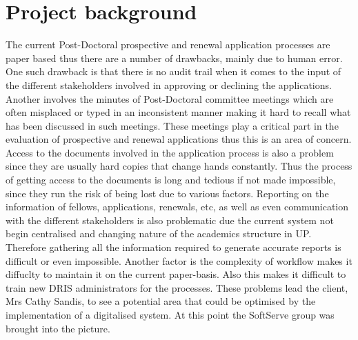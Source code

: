 \documentclass[12pt]{article}
\begin{document}
\section{Project background}
\vspace{0.2in}
The current Post-Doctoral prospective and renewal application processes are paper based thus there are a number of drawbacks, mainly due to human error. One such drawback is that there is no audit trail when it comes to the input of the different stakeholders involved in approving or declining the applications. Another involves the minutes of Post-Doctoral committee meetings which are often misplaced or typed in an inconsistent manner making it hard to recall what has been discussed in such meetings. These meetings play a critical part in the evaluation of prospective and renewal applications thus this is an area of concern. Access to the documents involved in the application process is also a problem since they are usually hard copies that change hands constantly. Thus the process of getting access to the documents is long and tedious if not made impossible, since they run the risk of being lost due to various factors. Reporting on the information of fellows, applications, renewals, etc, as well as even communication with the different stakeholders is also problematic due the current system not begin centralised and changing nature of the academics structure in UP. Therefore gathering all the information required to generate accurate reports is difficult or even impossible. Another factor is the complexity of workflow makes it diffuclty to maintain it on the current paper-basis. Also this makes it difficult to train new DRIS administrators for the processes. These problems lead the client, Mrs Cathy Sandis, to see a potential area that could be optimised by the implementation of a digitalised system. At this point the SoftServe group was brought into the picture.
\vspace{0.5in}

\newpage
\end{document}
